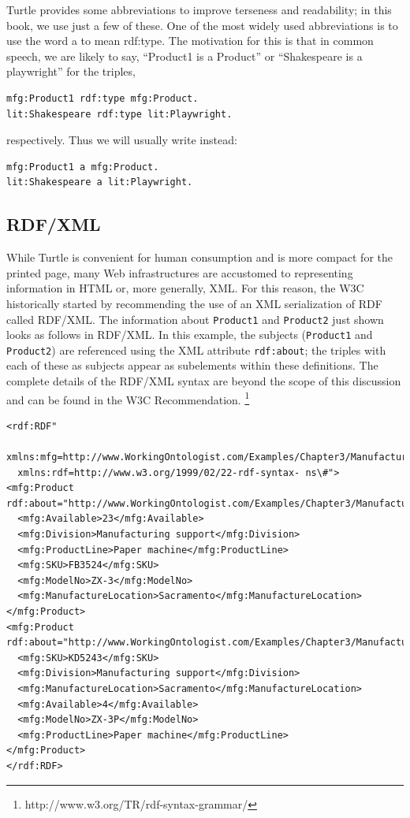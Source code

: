 Turtle provides some abbreviations to improve terseness and readability;
in this book, we use just a few of these. One of the most widely used
abbreviations is to use the word a to mean rdf:type. The motivation for
this is that in common speech, we are likely to say, ``Product1 is a
Product'' or ``Shakespeare is a playwright'' for the triples,

\begin{lstlisting}
mfg:Product1 rdf:type mfg:Product. 
lit:Shakespeare rdf:type lit:Playwright.
\end{lstlisting}

respectively. Thus we will usually write instead:

\begin{lstlisting}
mfg:Product1 a mfg:Product. 
lit:Shakespeare a lit:Playwright.
\end{lstlisting}

\subsection{RDF/XML}

While Turtle is convenient for human consumption and is more compact for
the printed page, many Web infrastructures are accustomed to
representing information in HTML or, more generally, XML. For this
reason, the W3C historically started by recommending the use of an XML
serialization of RDF called RDF/XML. The information about \texttt{Product1} and
\texttt{Product2} just shown looks as follows in RDF/XML. In this example, the
subjects (\texttt{Product1} and \texttt{Product2}) are referenced using the XML attribute
\texttt{rdf:about}; the triples with each of these as subjects appear as
subelements within these definitions. The complete details of the
RDF/XML syntax are beyond the scope of this discussion and can be found in the W3C Recommendation. \footnote{http://www.w3.org/TR/rdf-syntax-grammar/}

\begin{lstlisting}
<rdf:RDF" 
  xmlns:mfg=http://www.WorkingOntologist.com/Examples/Chapter3/Manufacturing\#"
  xmlns:rdf=http://www.w3.org/1999/02/22-rdf-syntax- ns\#">
<mfg:Product rdf:about="http://www.WorkingOntologist.com/Examples/Chapter3/Manufacturing\#Product1">
  <mfg:Available>23</mfg:Available>
  <mfg:Division>Manufacturing support</mfg:Division>
  <mfg:ProductLine>Paper machine</mfg:ProductLine>
  <mfg:SKU>FB3524</mfg:SKU>
  <mfg:ModelNo>ZX-3</mfg:ModelNo>
  <mfg:ManufactureLocation>Sacramento</mfg:ManufactureLocation>
</mfg:Product>
<mfg:Product rdf:about="http://www.WorkingOntologist.com/Examples/Chapter3/Manufacturing\#Product2">
  <mfg:SKU>KD5243</mfg:SKU>
  <mfg:Division>Manufacturing support</mfg:Division>
  <mfg:ManufactureLocation>Sacramento</mfg:ManufactureLocation>
  <mfg:Available>4</mfg:Available>
  <mfg:ModelNo>ZX-3P</mfg:ModelNo>
  <mfg:ProductLine>Paper machine</mfg:ProductLine>
</mfg:Product> 
</rdf:RDF>
\end{lstlisting}

